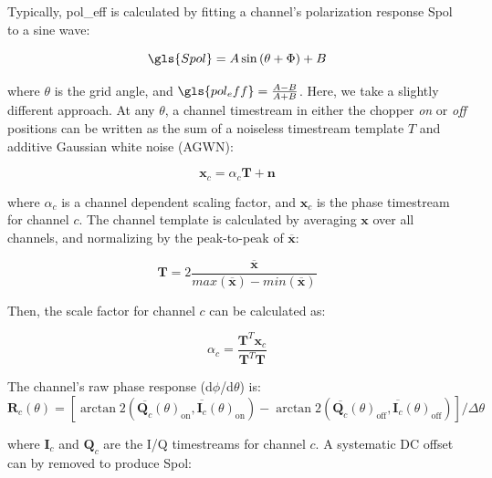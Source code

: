 Typically, \gls{pol_eff} is calculated by fitting a channel's polarization response \gls{Spol} to a sine wave:

\begin{equation}
  \gls{Spol} = A  \sin\left(\theta + \Phi\right) + B
\end{equation}

where $\theta$ is the grid angle, and $\gls{pol_eff} = \frac{A - B}{A + B}$. Here, we take a slightly different approach. At any $\theta$, a channel timestream in either the chopper \textit{on} or \textit{off} positions can be written as the sum of a noiseless timestream template $T$ and additive Gaussian white noise (AGWN):

\begin{equation}
  \mathbf{x}_{c} = \alpha_{c} \mathbf{T} + \mathbf{n}
\end{equation}

where $\alpha_{c}$ is a channel dependent scaling factor, and $\mathbf{x}_{c}$ is the phase timestream for channel $c$. The channel template is calculated by averaging $\mathbf{x}$ over all channels, and normalizing by the peak-to-peak of $\overline{\mathbf{x}}$:

\begin{equation}
  \mathbf{T} = 2 \frac{ \overline{\mathbf{x}} }{ max( \overline{\mathbf{x}} ) - min( \overline{  \mathbf{x}} ) }
\end{equation}

Then, the scale factor for channel $c$ can be calculated as:

\begin{equation}
 \alpha_{c} = \frac{ \mathbf{T}^{T} \mathbf{x}_{c} }{ \mathbf{T}^{T} \mathbf{T} }
\end{equation}

The channel's raw phase response (d$\phi$/d$\theta$) is:
\begin{equation}
  \mathbf{R}_{c}(\theta) = \left[ \arctan2( \overline{\mathbf{Q}_{c}}(\theta)_{\mathrm{on}},\overline{\mathbf{I}_{c}}(\theta)_{\mathrm{on}} ) - \arctan2( \overline{\mathbf{Q}_{c}}(\theta)_{\mathrm{off}},\overline{\mathbf{I}_{c}}(\theta)_{\mathrm{off}}) \right] \bigg/ \Delta{\theta}
\end{equation}

where $\mathbf{I}_{c}$ and $\mathbf{Q}_{c}$ are the I/Q timestreams for channel $c$. A systematic DC offset can by removed to produce \gls{Spol}:

